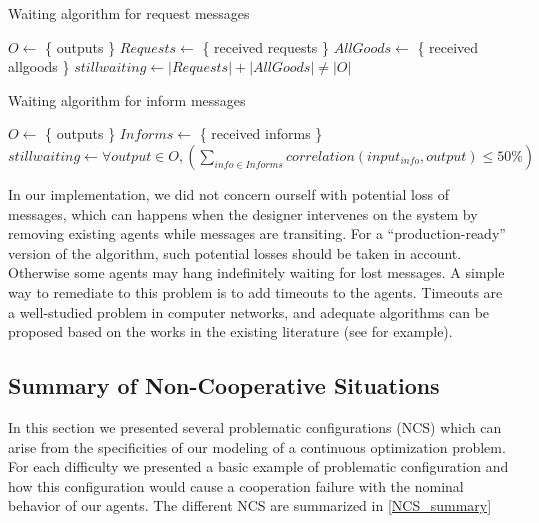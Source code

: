 \begin{algorithm}
\caption{Waiting algorithm for request messages}
\label{algo_waiting_requests}

	$O \leftarrow $ \{ outputs \}\;
	$Requests \leftarrow $ \{ received requests \}\;
	$AllGoods \leftarrow $ \{ received allgoods \}\;
	$stillwaiting \leftarrow |Requests| + |AllGoods| \neq |O|$\;

\end{algorithm}

\begin{algorithm}
\caption{Waiting algorithm for inform messages}
\label{algo_waiting_inform}

	$O \leftarrow $ \{ outputs \}\;
	$Informs \leftarrow $ \{ received informs \}\;
	$stillwaiting \leftarrow \forall output \in O,  (\displaystyle\sum_{info \in Informs}{ correlation(input_{info}, output) \leq 50\%})$\;

\end{algorithm}

In our implementation, we did not concern ourself with potential loss of messages, which can happens when the designer intervenes on the system by removing existing agents while messages are transiting. For a \enquote{production-ready} version of the algorithm, such potential losses should be taken in account. Otherwise some agents may hang indefinitely waiting for  lost messages. A simple way to remediate to this problem is to add timeouts to the agents. Timeouts are a well-studied problem in computer networks, and adequate algorithms can be proposed based on the works in the existing literature (see \cite{jacobson1988congestion} for example).

\subsection{Summary of Non-Cooperative Situations}

In this section we presented several problematic configurations (NCS) which can arise from the specificities of our modeling of a continuous optimization problem. For each difficulty we presented a basic example of problematic configuration and how this configuration would cause a cooperation failure with the nominal behavior of our agents. The different NCS are summarized in \tablename{} \ref{NCS_summary}

